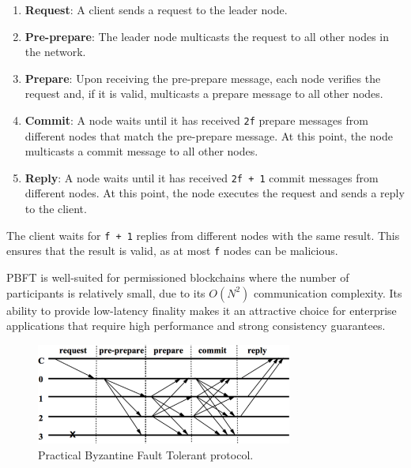 \begin{enumerate}
	\def\labelenumi{\arabic{enumi}.}
	\tightlist
	\item
	\textbf{Request}: A client sends a request to the leader node.
	\item
	\textbf{Pre-prepare}: The leader node multicasts the request to all
	other nodes in the network.
	\item
	\textbf{Prepare}: Upon receiving the pre-prepare message, each node
	verifies the request and, if it is valid, multicasts a prepare message
	to all other nodes.
	\item
	\textbf{Commit}: A node waits until it has received \texttt{2f}
	prepare messages from different nodes that match the pre-prepare
	message. At this point, the node multicasts a commit message to all
	other nodes.
	\item
	\textbf{Reply}: A node waits until it has received \texttt{2f\ +\ 1}
	commit messages from different nodes. At this point, the node executes
	the request and sends a reply to the client.
\end{enumerate}

The client waits for \texttt{f\ +\ 1} replies from different nodes with
the same result. This ensures that the result is valid, as at most
\texttt{f} nodes can be malicious.

PBFT is well-suited for permissioned blockchains where the number of
participants is relatively small, due to its $O(N^2)$ communication
complexity. Its ability to provide low-latency finality makes it an
attractive choice for enterprise applications that require high
performance and strong consistency guarantees.

\begin{figure}[t]
	\begin{center}
		\includegraphics[width=0.75\textwidth]{./figs/pbft.png}
		\caption{Practical Byzantine Fault Tolerant protocol.}		
		\label{fig:pbft}
	\end{center}	
\end{figure}

